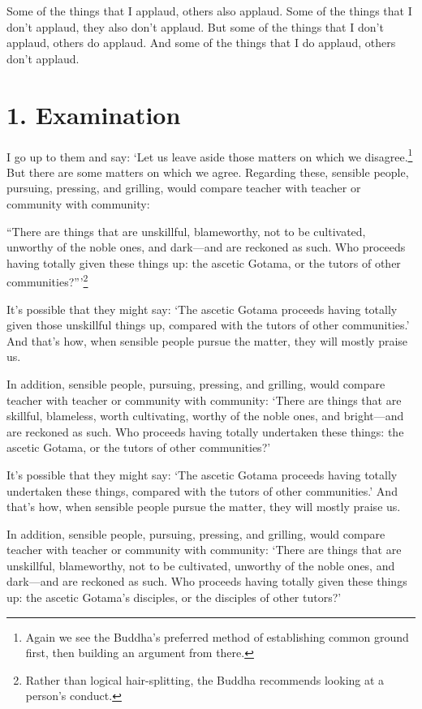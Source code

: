 \documentclass[12pt,openany]{book}%
\begin{document}
Some of the things that I applaud, others also applaud. Some of the things that I don’t applaud, they also don’t applaud. But some of the things that I don’t applaud, others do applaud. And some of the things that I do applaud, others don’t applaud. 

\section*{1. Examination }

I go up to them and say: ‘Let us leave aside those matters on which we disagree.\footnote{Again we see the Buddha’s preferred method of establishing common ground first, then building an argument from there. } But there are some matters on which we agree. Regarding these, sensible people, pursuing, pressing, and grilling, would compare teacher with teacher or community with community: 

“There are things that are unskillful, blameworthy, not to be cultivated, unworthy of the noble ones, and dark—and are reckoned as such. Who proceeds having totally given these things up: the ascetic Gotama, or the tutors of other communities?”’\footnote{Rather than logical hair-splitting, the Buddha recommends looking at a person’s conduct. } 

It’s possible that they might say: ‘The ascetic Gotama proceeds having totally given those unskillful things up, compared with the tutors of other communities.’ And that’s how, when sensible people pursue the matter, they will mostly praise us. 

In addition, sensible people, pursuing, pressing, and grilling, would compare teacher with teacher or community with community: ‘There are things that are skillful, blameless, worth cultivating, worthy of the noble ones, and bright—and are reckoned as such. Who proceeds having totally undertaken these things: the ascetic Gotama, or the tutors of other communities?’ 

It’s possible that they might say: ‘The ascetic Gotama proceeds having totally undertaken these things, compared with the tutors of other communities.’ And that’s how, when sensible people pursue the matter, they will mostly praise us. 

In addition, sensible people, pursuing, pressing, and grilling, would compare teacher with teacher or community with community: ‘There are things that are unskillful, blameworthy, not to be cultivated, unworthy of the noble ones, and dark—and are reckoned as such. Who proceeds having totally given these things up: the ascetic Gotama’s disciples, or the disciples of other tutors?’ 
\end{document}
